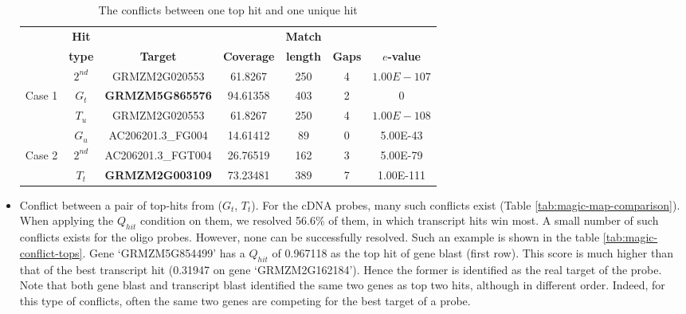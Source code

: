 \begin{itemize}
\begin{table}[b]
	\centering
	\begin{footnotesize}
	\caption{The conflicts between one top hit and one unique hit} 
	\label{tab:magic-conflict-topuniq}
	\begin{tabular}{@{}c|cccccc@{}}
	\toprule
	& \textbf{Hit} & & & \textbf{Match} & & \\
	& \textbf{type} & \textbf{Target} & \textbf{Coverage} & \textbf{length} 
	& \textbf{Gaps} & \textbf{$e$-value} \\ 
	\midrule
	& $2^{nd}$  & GRMZM2G020553 & 61.8267 & 250 & 4 & $1.00E-107$ \\ 
	Case 1 & \textbf{$G_t$} & \textbf{GRMZM5G865576} & 94.61358 & 403 & 2 & 0 
	\\ 
	& $T_u$ & GRMZM2G020553 & 61.8267 & 250 & 4 & $1.00E-108$ \\

 	\hline
 	
	& $G_u$ & AC206201.3\_FG004 & 14.61412 & 89 & 0 & 5.00E-43 \\
	Case 2 & $2^{nd}$ & AC206201.3\_FGT004 & 26.76519 & 162 & 3 & 5.00E-79 
	\\
	& $T_t$ & \textbf{GRMZM2G003109} & 73.23481 & 389 & 7 & 1.00E-111 \\
	\bottomrule
	\end{tabular}
	\end{footnotesize}
\end{table}

\item Conflict between a pair of top-hits from ($G_t$, $T_t$). 
For the cDNA probes, many such conflicts exist (Table 
\ref{tab:magic-map-comparison}). When applying the $Q_{hit}$ condition on them, 
we resolved 56.6\% of them, in which transcript hits win most.  
A small number of such conflicts exists for the oligo probes. However, none can 
be successfully resolved.
Such an example is shown in the table \ref{tab:magic-conflict-tops}. Gene  
‘GRMZM5G854499’ has a $Q_{hit}$ of 0.967118 as the top hit of gene blast (first 
row).  This score is much higher than that of the best transcript hit (0.31947 
on gene ‘GRMZM2G162184’).  Hence the former is identified as the real target of 
the probe. 
Note that both gene blast and transcript blast identified the same two genes as 
top two hits, although in different order.
Indeed, for this type of conflicts, often the same two genes are competing for 
the best target of a probe. 

\end{itemize}

